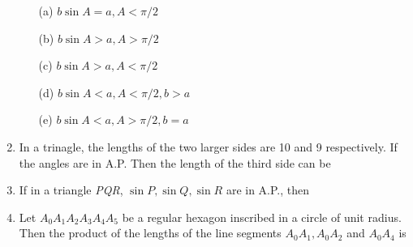 \documentclass[journal,12pt,twocolumn]{IEEEtran}
\begin{document}
\begin{enumerate}
 \begin{itemize}
 \item[(a)] $b\sin A=a, A<\pi/2$
 \item[(b)] $b\sin A>a, A>\pi/2$
 \item[(c)] $b\sin A>a, A<\pi/2$
 \item[(d)] $b\sin A<a, A<\pi/2, b>a$
 \item[(e)] $b\sin A<a, A>\pi/2, b=a$
 \end{itemize}
 \item In a trinagle, the lengths of the two larger sides are 10 and 9 respectively. If the angles are in A.P. Then the length of the third side can be
 \begin{itemize}
 \end{itemize}
 \item If in a triangle \textsl{PQR}, $\sin P, \sin Q, \sin R$ are in A.P., then
 \begin{itemize}
 \end{itemize}
 \item Let \textsl{$A_0A_1A_2A_3A_4A_5$} be a regular hexagon inscribed in a circle of unit radius. Then the product of the lengths of the line segments \textsl{$A_0A_1, A_0A_2$} and \textsl{$A_0A_4$} is
 \begin{itemize}

\end{itemize}
\end{enumerate}
\end{document}
